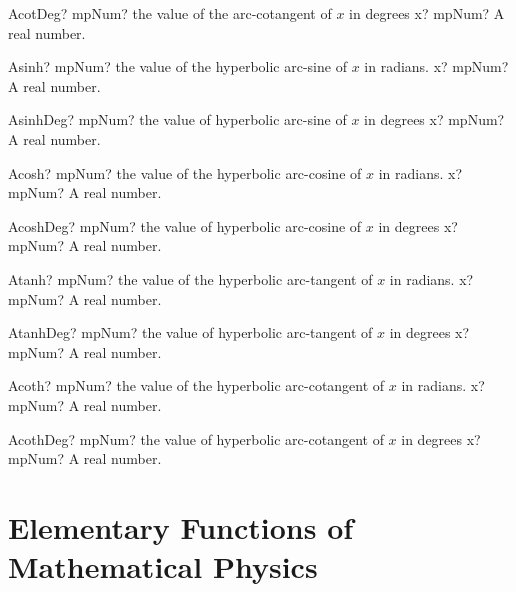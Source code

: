 \documentclass[12pt,a4paper,openany]{book}
\begin{document}
\begin{mpFunctionsExtract}
\mpFunctionOne
{AcotDeg? mpNum? the value of the arc-cotangent of $x$ in degrees}
{x? mpNum? A real number.}
\end{mpFunctionsExtract}

\begin{mpFunctionsExtract}
\mpFunctionOne
{Asinh? mpNum? the value of the hyperbolic arc-sine  of $x$ in radians.}
{x? mpNum? A real number.}
\end{mpFunctionsExtract}

\begin{mpFunctionsExtract}
\mpFunctionOne
{AsinhDeg? mpNum? the value of hyperbolic arc-sine  of $x$ in degrees}
{x? mpNum? A real number.}
\end{mpFunctionsExtract}

\begin{mpFunctionsExtract}
\mpFunctionOne
{Acosh? mpNum? the value of the hyperbolic arc-cosine  of $x$ in radians.}
{x? mpNum? A real number.}
\end{mpFunctionsExtract}

\begin{mpFunctionsExtract}
\mpFunctionOne
{AcoshDeg? mpNum? the value of hyperbolic arc-cosine  of $x$ in degrees}
{x? mpNum? A real number.}
\end{mpFunctionsExtract}

\begin{mpFunctionsExtract}
\mpFunctionOne
{Atanh? mpNum? the value of the hyperbolic arc-tangent  of $x$ in radians.}
{x? mpNum? A real number.}
\end{mpFunctionsExtract}

\begin{mpFunctionsExtract}
\mpFunctionOne
{AtanhDeg? mpNum? the value of hyperbolic arc-tangent  of $x$ in degrees}
{x? mpNum? A real number.}
\end{mpFunctionsExtract}

\begin{mpFunctionsExtract}
\mpFunctionOne
{Acoth? mpNum? the value of the hyperbolic arc-cotangent  of $x$ in radians.}
{x? mpNum? A real number.}
\end{mpFunctionsExtract}

\begin{mpFunctionsExtract}
\mpFunctionOne
{AcothDeg? mpNum? the value of hyperbolic arc-cotangent  of $x$ in degrees}
{x? mpNum? A real number.}
\end{mpFunctionsExtract}

\section{Elementary Functions of Mathematical Physics}
\end{document}
